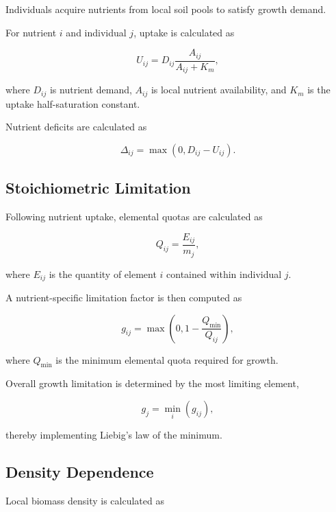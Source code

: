Individuals acquire nutrients from local soil pools to satisfy growth demand.

For nutrient $i$ and individual $j$, uptake is calculated as

\begin{equation}
U_{ij}
=
D_{ij}
\frac{A_{ij}}
     {A_{ij}+K_m},
\end{equation}

where $D_{ij}$ is nutrient demand, $A_{ij}$ is local nutrient availability, and $K_m$ is the uptake half-saturation constant.

Nutrient deficits are calculated as

\begin{equation}
\Delta_{ij}
=
\max(0,D_{ij}-U_{ij}).
\end{equation}

\subsection{Stoichiometric Limitation}

Following nutrient uptake, elemental quotas are calculated as

\begin{equation}
Q_{ij}
=
\frac{E_{ij}}
     {m_j},
\end{equation}

where $E_{ij}$ is the quantity of element $i$ contained within individual $j$.

A nutrient-specific limitation factor is then computed as

\begin{equation}
g_{ij}
=
\max
\left(
0,
1-\frac{Q_{\min}}
       {Q_{ij}}
\right),
\end{equation}

where $Q_{\min}$ is the minimum elemental quota required for growth.

Overall growth limitation is determined by the most limiting element,

\begin{equation}
g_j=\min_i(g_{ij}),
\end{equation}

thereby implementing Liebig's law of the minimum.

\subsection{Density Dependence}

Local biomass density is calculated as

